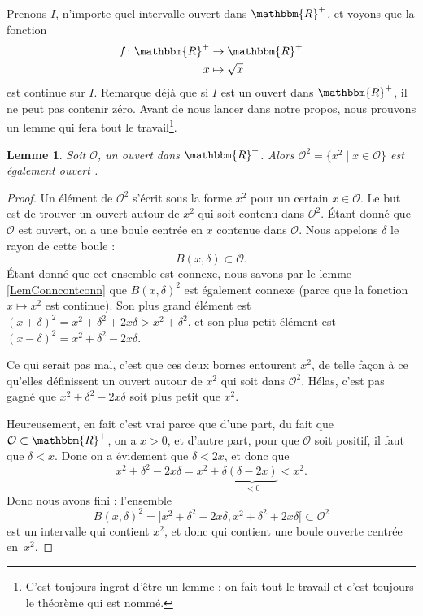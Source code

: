 \documentclass[a4paper,12pt]{book}
\newcommand{\eR}{\mathbbm{R}}
\newcounter{numtho}
\theoremstyle{mes_exemples}	\newtheorem{exemple}[numtho]{Exemple}
\theoremstyle{mes_tho}
\newtheorem{lemma}[numtho]{Lemme}
\newcommand{\tq}{\mid}
\newcommand{\mO}{\mathcal{O}}
\begin{document}
Prenons $I$, n'importe quel intervalle ouvert dans $\eR^+$, et voyons que la fonction
\begin{equation}
\begin{aligned}
 f\colon \eR^+&\to \eR^+ \\ 
   x&\mapsto \sqrt{x} 
\end{aligned}
\end{equation}
est continue sur $I$. Remarque déjà que si $I$ est un ouvert dans $\eR^+$, il ne peut pas contenir zéro. Avant de nous lancer dans notre propos, nous prouvons un lemme qui fera tout le travail\footnote{C'est toujours ingrat d'être un lemme : on fait tout le travail et c'est toujours le théorème qui est nommé.}.

\begin{lemma}
Soit $\mO$, un ouvert dans $\eR^+$. Alors $\mO^2=\{ x^2\tq x\in\mO \}$ est également ouvert .
\end{lemma}

\begin{proof}
Un élément de $\mO^2$ s'écrit sous la forme $x^2$ pour un certain $x\in\mO$. Le but est de trouver un ouvert autour de $x^2$ qui soit contenu dans $\mO^2$. Étant donné que $\mO$ est ouvert, on a une boule centrée en $x$ contenue dans $\mO$. Nous appelons $\delta$ le rayon de cette boule :
\[ 
  B(x,\delta)\subset\mO.
\]
Étant donné que cet ensemble est connexe, nous savons par le lemme \ref{LemConncontconn} que $B(x,\delta)^2$ est également connexe (parce que la fonction $x\mapsto x^2$ est continue). Son plus grand élément est $(x+\delta)^2=x^2+\delta^2+2x\delta>x^2+\delta^2$, et son plus petit élément est $(x-\delta)^2=x^2+\delta^2-2x\delta$. 

Ce qui serait pas mal, c'est que ces deux bornes entourent $x^2$, de telle façon à ce qu'elles définissent un ouvert autour de $x^2$ qui soit dans $\mO^2$. Hélas, c'est pas gagné que $x^2+\delta^2-2x\delta$ soit plus petit que $x^2$. 

Heureusement, en fait c'est vrai parce que d'une part, du fait que $\mO\subset\eR^+$, on a $x>0$, et d'autre part, pour que $\mO$ soit positif, il faut que $\delta<x$. Donc on a évidement que $\delta<2x$, et donc que
\[ 
  x^2+\delta^2-2x\delta=x^2+\delta\underbrace{(\delta-2x)}_{<0}<x^2.
\]
Donc nous avons fini : l'ensemble
\[ 
  B(x,\delta)^2=]x^2+\delta^2-2x\delta,x^2+\delta^2+2x\delta[\subset\mO^2
\]
est un intervalle qui contient $x^2$, et donc qui contient une boule ouverte centrée en~$x^2$.

\end{proof}
\end{document}
